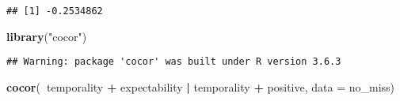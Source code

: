 \documentclass[
]{article}
\newenvironment{Shaded}{\begin{snugshade}}{\end{snugshade}}
\newcommand{\DataTypeTok}[1]{\textcolor[rgb]{0.13,0.29,0.53}{#1}}
\newcommand{\KeywordTok}[1]{\textcolor[rgb]{0.13,0.29,0.53}{\textbf{#1}}}
\newcommand{\NormalTok}[1]{#1}
\newcommand{\OperatorTok}[1]{\textcolor[rgb]{0.81,0.36,0.00}{\textbf{#1}}}
\newcommand{\StringTok}[1]{\textcolor[rgb]{0.31,0.60,0.02}{#1}}
\begin{document}
\begin{verbatim}
## [1] -0.2534862
\end{verbatim}

\begin{Shaded}
\begin{Highlighting}[]
\KeywordTok{library}\NormalTok{(}\StringTok{"cocor"}\NormalTok{)}
\end{Highlighting}
\end{Shaded}

\begin{verbatim}
## Warning: package 'cocor' was built under R version 3.6.3
\end{verbatim}

\begin{Shaded}
\begin{Highlighting}[]
\KeywordTok{cocor}\NormalTok{(}\OperatorTok{~}\NormalTok{temporality }\OperatorTok{+}\StringTok{ }\NormalTok{expectability }\OperatorTok{|}\StringTok{ }\NormalTok{temporality }\OperatorTok{+}\StringTok{ }\NormalTok{positive, }\DataTypeTok{data =}\NormalTok{ no_miss)}
\end{Highlighting}
\end{Shaded}
\end{document}
